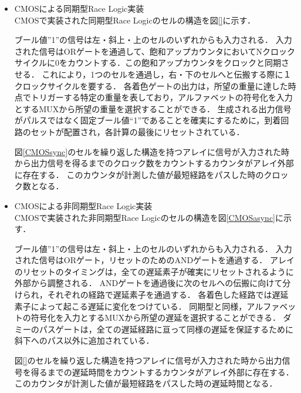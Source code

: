 \begin{itemize}
\item CMOSによる同期型Race Logic実装\\
CMOSで実装された同期型Race Logicのセルの構造を図\ref{}に示す．

ブール値”1”の信号は左・斜上・上のセルのいずれからも入力される．
入力された信号はORゲートを通過して、飽和アップカウンタにおいてNクロックサイクルに0をカウントする．この飽和アップカウンタをクロックと同期させる．
これにより，1つのセルを通過し，右・下のセルへと伝搬する際に１クロックサイクルを要する．
各着色ゲートの出力は，所望の重量に達した時点でトリガーする特定の重量を表しており，アルファベットの符号化を入力とするMUXから所望の重量を選択することができる．
生成される出力信号がパルスではなく固定ブール値“1”であることを確実にするために，到着回路のセットが配置され，各計算の最後にリセットされている．

図\ref{CMOSsync}のセルを繰り返した構造を持つアレイに信号が入力された時から出力信号を得るまでのクロック数をカウントするカウンタがアレイ外部に存在する．
このカウンタが計測した値が最短経路をパスした時のクロック数となる．

\item CMOSによる非同期型Race Logic実装\\
CMOSで実装された非同期型Race Logicのセルの構造を図\ref{CMOSasync}に示す．

ブール値”1”の信号は左・斜上・上のセルのいずれからも入力される．
入力された信号はORゲート，リセットのためのANDゲートを通過する．
アレイのリセットのタイミングは，全ての遅延素子が確実にリセットされるように外部から調整される．
ANDゲートを通過後に次のセルへの伝搬に向けて分けられ，それぞれの経路で遅延素子を通過する．
各着色した経路では遅延素子によって起こる遅延に変化をつけている．
同期型と同様，アルファベットの符号化を入力とするMUXから所望の遅延を選択することができる．
ダミーのパスゲートは，全ての遅延経路に亘って同様の遅延を保証するために斜下へのパス以外に追加されている．

図\ref{}のセルを繰り返した構造を持つアレイに信号が入力された時から出力信号を得るまでの遅延時間をカウントするカウンタがアレイ外部に存在する．
このカウンタが計測した値が最短経路をパスした時の遅延時間となる．

\end{itemize}

